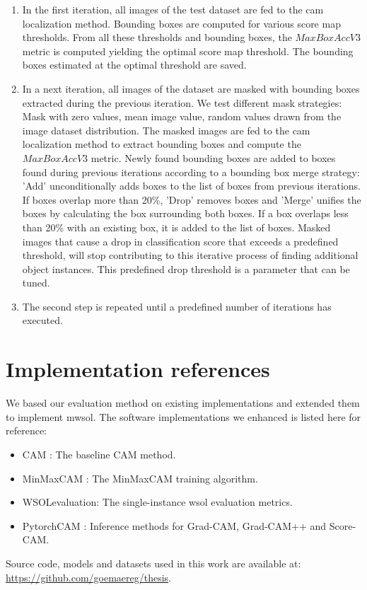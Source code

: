 \begin{enumerate}
    \item In the first iteration, all images of the test dataset are fed to the \acrshort{cam} localization method. Bounding boxes are computed for various score map thresholds. From all these thresholds and bounding boxes, the $MaxBoxAccV3$ metric is computed yielding the optimal score map threshold. The bounding boxes estimated at the optimal threshold are saved.
    \item In a next iteration, all images of the dataset are masked with bounding boxes extracted during the previous iteration. We test different mask strategies: Mask with zero values, mean image value, random values drawn from the image dataset distribution. The masked images are fed to the \acrshort{cam} localization method to extract bounding boxes and compute the $MaxBoxAccV3$ metric. Newly found bounding boxes are added to boxes found during previous iterations according to a bounding box merge strategy: 'Add' unconditionally adds boxes to the list of boxes from previous iterations. If boxes overlap more than 20\%, 'Drop' removes boxes and 'Merge' unifies the boxes by calculating the box surrounding both boxes. If a box overlaps less than 20\% with an existing box, it is added to the list of boxes. Masked images that cause a drop in classification score that exceeds a predefined threshold, will stop contributing to this iterative process of finding additional object instances. This predefined drop threshold is a parameter that can be tuned.
    \item The second step is repeated until a predefined number of iterations  has executed.
\end{enumerate}

\section{Implementation references}
We based our evaluation method on existing implementations and extended them to implement \acrlong{mwsol}. The software implementations we enhanced is listed here for reference:
\begin{itemize}
    \item CAM \cite{code:CAM}: The baseline CAM method.
    \item MinMaxCAM \cite{code:MinMaxCAM}: The MinMaxCAM training algorithm.
    \item WSOLevaluation\cite{code:WSOLevaluation}: The single-instance \acrshort{wsol} evaluation metrics.
    \item PytorchCAM \cite{code:PytorchCAM}: Inference methods for Grad-CAM, Grad-CAM++ and Score-CAM.
\end{itemize}

Source code, models and datasets used in this work are available at:\\ \url{https://github.com/goemaereg/thesis}.
